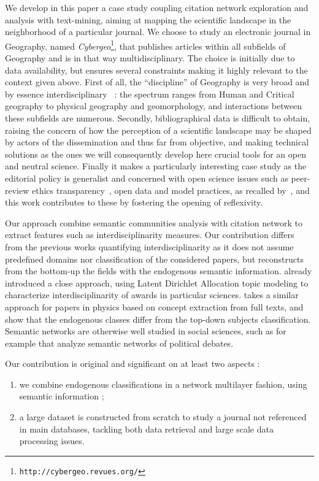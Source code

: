 We develop in this paper a case study coupling citation network exploration and analysis with text-mining, aiming at mapping the scientific landscape in the neighborhood of a particular journal. We choose to study an electronic journal in Geography, named \textit{Cybergeo}\footnote{\texttt{http://cybergeo.revues.org/}}, that publishes articles within all subfields of Geography and is in that way multidisciplinary. The choice is initially due to data availability, but ensures several constraints making it highly relevant to the context given above. First of all, the ``discipline'' of Geography is very broad and by essence interdisciplinary~\cite{bracken2016interdisciplinarity} : the spectrum ranges from Human and Critical geography to physical geography and geomorphology, and interactions between these subfields are numerous. Secondly, bibliographical data is difficult to obtain, raising the concern of how the perception of a scientific landscape may be shaped by actors of the dissemination and thus far from objective, and making technical solutions as the ones we will consequently develop here crucial tools for an open and neutral science. Finally it makes a particularly interesting case study as the editorial policy is generalist and concerned with open science issues such as peer-review ethics transparency~\citep{10.1371/journal.pone.0147913}, open data and model practices, as recalled by~\cite{pumain2015adapting}, and this work contributes to these by fostering the opening of reflexivity.


Our approach combine semantic communities analysis with citation network to extract features such as interdisciplinarity measures. Our contribution differs from the previous works quantifying interdisciplinarity as it does not assume predefined domains nor classification of the considered papers, but reconstructs from the bottom-up the fields with the endogenous semantic information. \cite{nichols2014topic} already introduced a close approach, using Latent Dirichlet Allocation topic modeling to characterize interdisciplinarity of awards in particular sciences. \cite{palchykov2016ground} takes a similar approach for papers in physics based on concept extraction from full texts, and show that the endogenous classes differ from the top-down subjects classification. Semantic networks are otherwise well studied in social sciences, such as for example \cite{2015arXiv151003797G} that analyze semantic networks of political debates.


Our contribution is original and significant on at least two aspects :
\begin{enumerate}
	\item we combine endogenous classifications in a network multilayer fashion, using semantic information ;
	\item a large dataset is constructed from scratch to study a journal not referenced in main databases, tackling both data retrieval and large scale data processing issues.
\end{enumerate}

